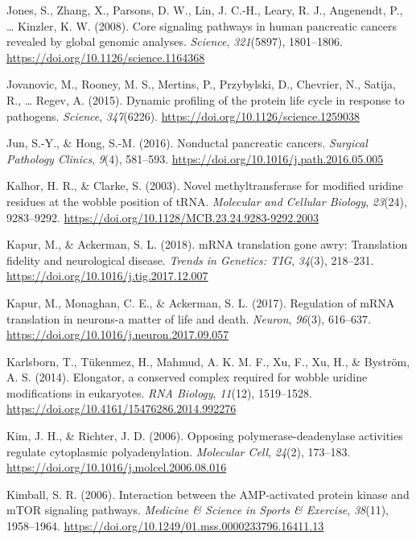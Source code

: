 \documentclass[12pt,openany]{book}
\begin{document}
\hypertarget{ref-Jones2008}{}
Jones, S., Zhang, X., Parsons, D. W., Lin, J. C.-H., Leary, R. J.,
Angenendt, P., \ldots{} Kinzler, K. W. (2008). Core signaling pathways
in human pancreatic cancers revealed by global genomic analyses.
\emph{Science}, \emph{321}(5897), 1801--1806.
\url{https://doi.org/10.1126/science.1164368}

\hypertarget{ref-Jovanovic2015}{}
Jovanovic, M., Rooney, M. S., Mertins, P., Przybylski, D., Chevrier, N.,
Satija, R., \ldots{} Regev, A. (2015). Dynamic profiling of the protein
life cycle in response to pathogens. \emph{Science}, \emph{347}(6226).
\url{https://doi.org/10.1126/science.1259038}

\hypertarget{ref-Jun2016}{}
Jun, S.-Y., \& Hong, S.-M. (2016). Nonductal pancreatic cancers.
\emph{Surgical Pathology Clinics}, \emph{9}(4), 581--593.
\url{https://doi.org/10.1016/j.path.2016.05.005}

\hypertarget{ref-Kalhor2003}{}
Kalhor, H. R., \& Clarke, S. (2003). Novel methyltransferase for
modified uridine residues at the wobble position of tRNA.
\emph{Molecular and Cellular Biology}, \emph{23}(24), 9283--9292.
\url{https://doi.org/10.1128/MCB.23.24.9283-9292.2003}

\hypertarget{ref-Kapur2018}{}
Kapur, M., \& Ackerman, S. L. (2018). mRNA translation gone awry:
Translation fidelity and neurological disease. \emph{Trends in Genetics:
TIG}, \emph{34}(3), 218--231.
\url{https://doi.org/10.1016/j.tig.2017.12.007}

\hypertarget{ref-Kapur2017}{}
Kapur, M., Monaghan, C. E., \& Ackerman, S. L. (2017). Regulation of
mRNA translation in neurons-a matter of life and death. \emph{Neuron},
\emph{96}(3), 616--637.
\url{https://doi.org/10.1016/j.neuron.2017.09.057}

\hypertarget{ref-Karlsborn2014}{}
Karlsborn, T., Tükenmez, H., Mahmud, A. K. M. F., Xu, F., Xu, H., \&
Byström, A. S. (2014). Elongator, a conserved complex required for
wobble uridine modifications in eukaryotes. \emph{RNA Biology},
\emph{11}(12), 1519--1528.
\url{https://doi.org/10.4161/15476286.2014.992276}

\hypertarget{ref-Kim2006}{}
Kim, J. H., \& Richter, J. D. (2006). Opposing polymerase-deadenylase
activities regulate cytoplasmic polyadenylation. \emph{Molecular Cell},
\emph{24}(2), 173--183.
\url{https://doi.org/10.1016/j.molcel.2006.08.016}

\hypertarget{ref-Kimball2006}{}
Kimball, S. R. (2006). Interaction between the AMP-activated protein
kinase and mTOR signaling pathways. \emph{Medicine \& Science in Sports
\& Exercise}, \emph{38}(11), 1958--1964.
\url{https://doi.org/10.1249/01.mss.0000233796.16411.13}
\end{document}
